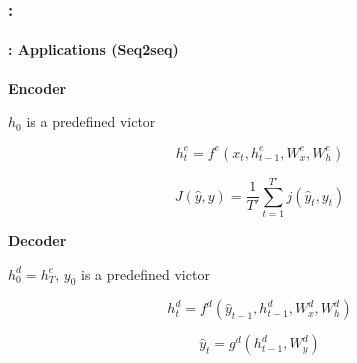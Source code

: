 \documentclass[xcolor=table]{beamer}
\begin{document}
\begin{frame}
	\frametitle{\insertshortsubtitle: \insertsection}
	\framesubtitle{\insertsubsection: Applications (Seq2seq)}
	

	\begin{minipage}{0.45\textwidth}
		\centering\vskip8pt
		\textbf{Encoder}
		
		$h_0$ is a predefined victor
		
		\[ h^e_t = f^e(x_t, h^e_{t-1}, W^e_x, W^e_h) \]
		
		\[ J(\hat{y}, y) = \frac{1}{T'} \sum_{t=1}^{T'} j(\hat{y}_{t}, y_t)\]
		
	\end{minipage}
	\begin{minipage}{0.45\textwidth}
		\centering
		\textbf{Decoder}
		
		$h^d_{0} = h^e_{T}$, $y_0$ is a predefined victor
		
		\[h^d_{t} = f^d(\hat{y}_{t-1}, h^d_{t-1}, W^d_x, W^d_h)\]
		
		\[ \hat{y}_{t} = g^d(h^d_{t-1}, W^d_y)\]
	\end{minipage}
	
	\vspace{-12pt}
	\begin{center}
	\end{center}
\end{frame}
\end{document}
